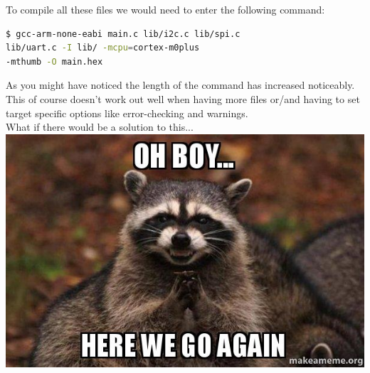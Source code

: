 \documentclass{beamer}
\begin{document}
\begin{frame}[fragile]
To compile all these files we would need to enter the following command:
\begin{lstlisting}[language=bash]
$ gcc-arm-none-eabi main.c lib/i2c.c lib/spi.c 
lib/uart.c -I lib/ -mcpu=cortex-m0plus 
-mthumb -O main.hex
\end{lstlisting}
As you might have noticed the length of the command has increased noticeably.\\ \bigskip
This of course doesn't work out well when having more files or/and having to set target specific options like error-checking and warnings. \\ \bigskip
What if there would be a solution to this... \\ \bigskip
\includegraphics[scale=0.2]{figures/oh-boy-here-ili724.jpg}
\end{frame}
\end{document}
